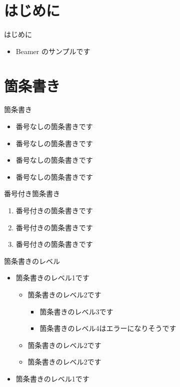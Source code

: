 \section{はじめに}

\begin{frame}{はじめに}
  \begin{itemize}
    \item Beamer のサンプルです
  \end{itemize}
\end{frame}

\section{箇条書き}

\begin{frame}{箇条書き}
  \begin{itemize}
    \item 番号なしの箇条書きです
    \item 番号なしの箇条書きです
    \item 番号なしの箇条書きです
    \item 番号なしの箇条書きです
  \end{itemize}
\end{frame}

\begin{frame}{番号付き箇条書き}
  \begin{enumerate}
    \item 番号付きの箇条書きです
    \item 番号付きの箇条書きです
    \item 番号付きの箇条書きです
  \end{enumerate}
\end{frame}

\begin{frame}{箇条書きのレベル}
  \begin{itemize}
    \item 箇条書きのレベル1です
    \begin{itemize}
      \item 箇条書きのレベル2です
      \begin{itemize}
        \item 箇条書きのレベル3です
        \item 箇条書きのレベル4はエラーになりそうです
      \end{itemize}
      \item 箇条書きのレベル2です
      \item 箇条書きのレベル2です
    \end{itemize}
    \item 箇条書きのレベル1です
  \end{itemize}
\end{frame}



